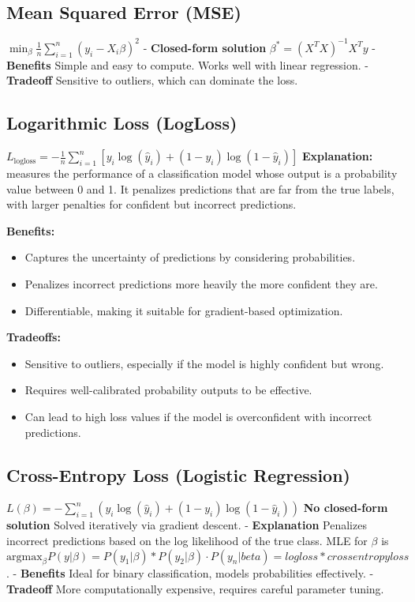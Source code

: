 \documentclass[10pt]{article}
\begin{document}
\begin{multicols}{2}
\subsection*{Mean Squared Error (MSE)}
$\min_{\beta} \frac{1}{n} \sum_{i=1}^{n} (y_i - X_i\beta)^2$
- \textbf{Closed-form solution} $\beta^* = (X^TX)^{-1}X^Ty$
- \textbf{Benefits} Simple and easy to compute. Works well with linear regression.
- \textbf{Tradeoff} Sensitive to outliers, which can dominate the loss.



\subsection*{Logarithmic Loss (LogLoss)}

$L_{\text{logloss}} = -\frac{1}{n} \sum_{i=1}^{n} \left[ y_i \log(\hat{y}_i) + (1 - y_i) \log(1 - \hat{y}_i) \right]$
\textbf{Explanation:} measures the performance of a classification model whose output is a probability value between 0 and 1. It penalizes predictions that are far from the true labels, with larger penalties for confident but incorrect predictions.

\textbf{Benefits:}
\begin{itemize}
    \item Captures the uncertainty of predictions by considering probabilities.
    \item Penalizes incorrect predictions more heavily the more confident they are.
    \item Differentiable, making it suitable for gradient-based optimization.
\end{itemize}

\textbf{Tradeoffs:}
\begin{itemize}
    \item Sensitive to outliers, especially if the model is highly confident but wrong.
    \item Requires well-calibrated probability outputs to be effective.
    \item Can lead to high loss values if the model is overconfident with incorrect predictions.
\end{itemize}










\subsection*{Cross-Entropy Loss (Logistic Regression)}
$L(\beta) = - \sum_{i=1}^{n} \left(y_i \log(\hat{y}_i) + (1 - y_i) \log(1 - \hat{y}_i)\right)$
\textbf{No closed-form solution} Solved iteratively via gradient descent.
- \textbf{Explanation} Penalizes incorrect predictions based on the log likelihood of the true class. MLE for $\beta$ is $\text{argmax}_{\beta} P(y|\beta) = P(y_1|\beta) * P(y_2|\beta)\cdot P(y_n|beta) = log loss * cross entropy loss$.
- \textbf{Benefits} Ideal for binary classification, models probabilities effectively.
- \textbf{Tradeoff} More computationally expensive, requires careful parameter tuning.


\end{multicols}
\end{document}
